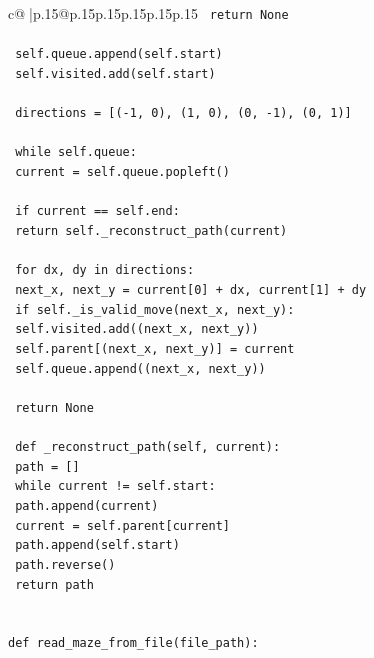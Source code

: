 \documentclass{article}
\begin{document}
{\begin{supertabular}{c@{$\;$}|p{.15\linewidth}@{}p{.15\linewidth}p{.15\linewidth}p{.15\linewidth}p{.15\linewidth}p{.15\linewidth}}
{{{\texttt{            return None} \\
\\ 
\texttt{        self.queue.append(self.start)} \\
\texttt{        self.visited.add(self.start)} \\
\\ 
\texttt{        directions = {[}({-}1, 0), (1, 0), (0, {-}1), (0, 1){]}} \\
\\ 
\texttt{        while self.queue:} \\
\texttt{            current = self.queue.popleft()} \\
\\ 
\texttt{            if current == self.end:} \\
\texttt{                return self.\_reconstruct\_path(current)} \\
\\ 
\texttt{            for dx, dy in directions:} \\
\texttt{                next\_x, next\_y = current{[}0{]} + dx, current{[}1{]} + dy} \\
\texttt{                if self.\_is\_valid\_move(next\_x, next\_y):} \\
\texttt{                    self.visited.add((next\_x, next\_y))} \\
\texttt{                    self.parent{[}(next\_x, next\_y){]} = current} \\
\texttt{                    self.queue.append((next\_x, next\_y))} \\
\\ 
\texttt{        return None} \\
\\ 
\texttt{    def \_reconstruct\_path(self, current):} \\
\texttt{        path = {[}{]}} \\
\texttt{        while current != self.start:} \\
\texttt{            path.append(current)} \\
\texttt{            current = self.parent{[}current{]}} \\
\texttt{        path.append(self.start)} \\
\texttt{        path.reverse()} \\
\texttt{        return path} \\
\\ 
\\ 
\texttt{def read\_maze\_from\_file(file\_path):} \\
}}}
\end{supertabular}}
\end{document}
